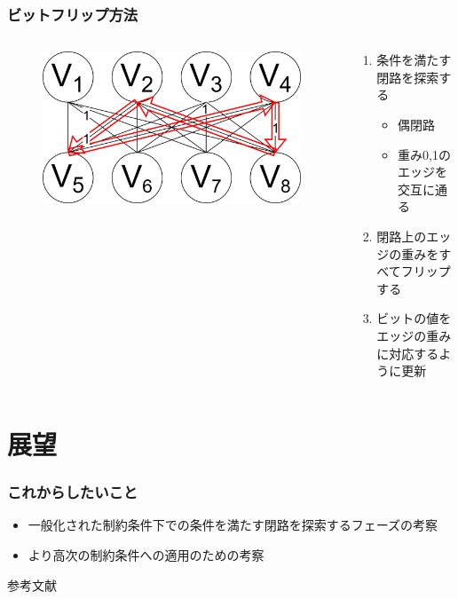 \begin{frame}
  \frametitle{ビットフリップ方法}
    \begin{columns}
      \begin{column}{0.47\linewidth}
        \begin{figure}
          \includegraphics[width=1\linewidth]{data/kanzen2ji_path.png}       
        \end{figure}
      \end{column}
      \begin{column}{0.47\linewidth}
          \begin{enumerate}
            \item 条件を満たす閉路を探索する
            \begin{itemize}
              \item 偶閉路
              \item 重み0,1のエッジを交互に通る
            \end{itemize}
            \item 閉路上のエッジの重みをすべてフリップする
            \item ビットの値をエッジの重みに対応するように更新
          \end{enumerate}
      \end{column}
    \end{columns}
\end{frame}

\section{展望}
\begin{frame}
  \frametitle{これからしたいこと}
  \begin{itemize}
    \item 一般化された制約条件下での条件を満たす閉路を探索するフェーズの考察
    \item より高次の制約条件への適用のための考察
  \end{itemize}
\end{frame}

\begin{frame}[t]{参考文献}
  \footnotesize

  
  
\end{frame}



